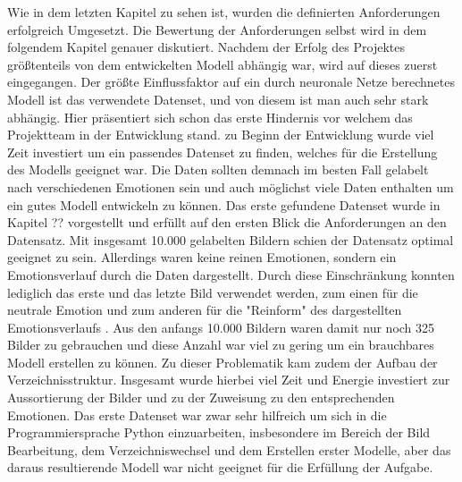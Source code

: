 \documentclass[12pt, a4paper]{report}
\begin{document}
Wie in dem letzten Kapitel zu sehen ist, wurden die definierten Anforderungen erfolgreich Umgesetzt. Die Bewertung der Anforderungen selbst wird in dem folgendem Kapitel genauer diskutiert. Nachdem der Erfolg des Projektes größtenteils von dem entwickelten Modell abhängig war, wird auf dieses zuerst eingegangen. 
\newline
Der größte Einflussfaktor auf ein durch neuronale Netze berechnetes Modell ist das verwendete Datenset, und von diesem ist man auch sehr stark abhängig. Hier präsentiert sich schon das erste Hindernis vor welchem das Projektteam in der Entwicklung stand. zu Beginn der Entwicklung wurde viel Zeit investiert um ein passendes Datenset zu finden, welches für die Erstellung des Modells geeignet war. Die Daten sollten demnach im besten Fall gelabelt nach verschiedenen Emotionen sein und auch möglichst viele Daten enthalten um ein gutes Modell entwickeln zu können. Das erste gefundene Datenset wurde in Kapitel ?? vorgestellt und erfüllt auf den ersten Blick die Anforderungen an den Datensatz. Mit insgesamt 10.000 gelabelten Bildern schien der Datensatz optimal geeignet zu sein. Allerdings waren keine reinen Emotionen, sondern ein Emotionsverlauf durch die Daten dargestellt. Durch diese Einschränkung konnten lediglich das erste und das letzte Bild verwendet werden, zum einen für die neutrale Emotion und zum anderen für die "Reinform" des dargestellten Emotionsverlaufs . Aus den anfangs 10.000 Bildern waren damit nur noch 325 Bilder zu gebrauchen und diese Anzahl war viel zu gering um ein brauchbares Modell erstellen zu können. Zu dieser Problematik kam zudem der Aufbau der Verzeichnisstruktur. Insgesamt wurde hierbei viel Zeit und Energie investiert zur Aussortierung der Bilder und zu der Zuweisung zu den entsprechenden Emotionen. Das erste Datenset war zwar sehr hilfreich um sich in die Programmiersprache Python einzuarbeiten, insbesondere im Bereich der Bild Bearbeitung, dem Verzeichniswechsel und dem Erstellen erster Modelle, aber das daraus resultierende Modell war nicht geeignet für die Erfüllung der Aufgabe.
\newline
\end{document}
